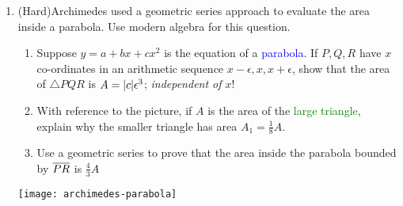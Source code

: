 \begin{exercises}
\begin{enumerate}
 	\item (Hard)\lstsp Archimedes used a geometric series approach to evaluate the area inside a parabola. Use modern algebra for this question.\par
 	\begin{minipage}[t]{0.6\linewidth}\vspace{-5pt}
 	 	\begin{enumerate}
  	\item Suppose $y=a+bx+cx^2$ is the equation of a \textcolor{blue}{parabola}. If $P,Q,R$ have $x$ co-ordinates in an arithmetic sequence $x-\epsilon,x,x+\epsilon$, show that the area of $\triangle PQR$ is $A=\left| c\right|\!\epsilon^3$; \emph{independent of $x$}!
  	\item With reference to the picture, if $A$ is the area of the \textcolor{Green}{large triangle}, explain why the smaller triangle has area $A_1=\frac 18A$.
  	\item Use a geometric series to prove that the area inside the parabola bounded by $\overline{PR}$ is $\frac 43A$
 	\end{enumerate}
 	\end{minipage}\hfill\begin{minipage}[t]{0.39\linewidth}\vspace{-5pt}
 	\flushright\texttt{[image: archimedes-parabola]}
 	\end{minipage}

\end{enumerate}
\end{exercises}






